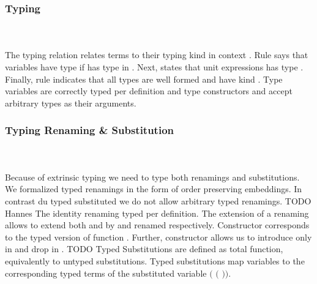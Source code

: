 \subsubsection{Typing}\hfill\\\\
The typing relation    \Data{:}  relates terms  to their typing kind  in context .
\FTyping
Rule  says that variables   have type  if  has type  in . Next,  states that unit expressions  has type . 
Finally, rule  indicates that all types  are well formed and have kind . Type variables are correctly typed per definition and type constructors  and  accept arbitrary types as their arguments.

\subsubsection{Typing Renaming \& Substitution}\hfill\\\\
Because of extrinsic typing we need to type both renamings and substitutions. We formalized typed renamings in the form of order preserving embeddings. In contrast du typed substituted we do not allow arbitrary typed renamings.
TODO Hannes
\FRenTyping
The identity renaming  typed per definition. The extension of a renaming  allows to extend both  and  by  and renamed  respectively. Constructor  corresponds to the typed version of function . Further, constructor  allows us to introduce  only in  and drop  in . TODO
Typed Substitutions are defined as total function, equivalently to untyped substitutions.
\FSubTyping
Typed substitutions map variables  to the corresponding typed terms of the substituted variable     \Data{:} $($  $($  $))$. 
